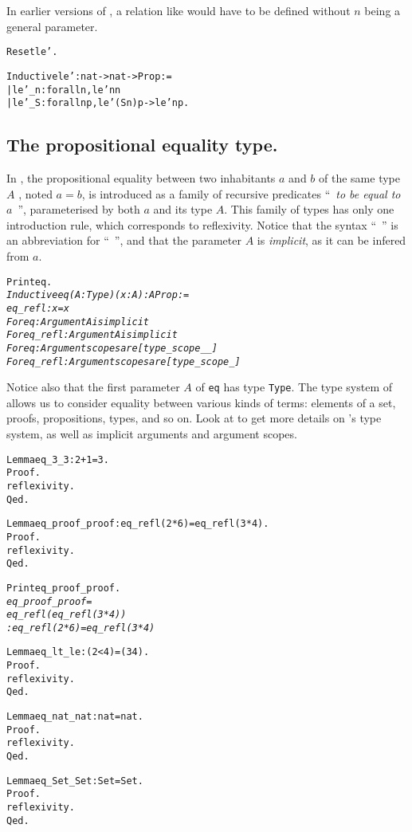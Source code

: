 \documentclass[11pt]{article}
\begin{document}
In earlier versions of {\coq}, a relation like  would have to be
defined without $n$ being a general parameter.

\begin{alltt}
Reset le'.

Inductive le': nat-> nat -> Prop :=
 | le'_n : forall n, le' n n
 | le'_S : forall n p, le' (S n) p -> le' n p.
\end{alltt}




\subsection{The propositional equality type.} \label{equality}
In {\coq}, the propositional equality between two inhabitants $a$ and
$b$ of
the same type $A$ ,
noted $a=b$, is introduced as a family of recursive predicates
``~\textsl{to be equal to $a$}~'',  parameterised by both $a$ and its type
$A$. This family of types has only one introduction rule, which
corresponds to reflexivity.
Notice that the syntax ``~'' is an abbreviation  
for ``~'', and that the parameter $A$ is \emph{implicit},
as it can be infered from $a$.
\begin{alltt}
Print eq.
\it{} Inductive eq (A : Type) (x : A) : A \arrow{} Prop :=  
    eq_refl : x = x
For eq: Argument A is implicit
For eq_refl: Argument A is implicit
For eq: Argument scopes are [type_scope _ _]
For eq_refl: Argument scopes are [type_scope _]
\end{alltt}

Notice also that  the first parameter $A$ of \texttt{eq} has type
\texttt{Type}. The type system of {\coq} allows us to consider equality between 
various kinds of terms: elements of a set, proofs, propositions,
types, and so on.
Look at \cite{coqrefman, coqart} to get more details on {\coq}'s type
system, as well as implicit arguments and argument scopes.


\begin{alltt}
Lemma eq_3_3 : 2 + 1 = 3.
Proof.
 reflexivity.
Qed.

Lemma eq_proof_proof : eq_refl (2*6) = eq_refl (3*4).
Proof.
 reflexivity.
Qed.

Print eq_proof_proof.
\it eq_proof_proof = 
eq_refl (eq_refl (3 * 4))
     : eq_refl (2 * 6) = eq_refl (3 * 4)
\tt

Lemma eq_lt_le : ( 2 < 4) = (3 {\coqle} 4).
Proof.
 reflexivity.
Qed.

Lemma eq_nat_nat : nat = nat.
Proof.
 reflexivity.
Qed.

Lemma eq_Set_Set : Set = Set.
Proof.
 reflexivity.
Qed.
\end{alltt}
\end{document}
